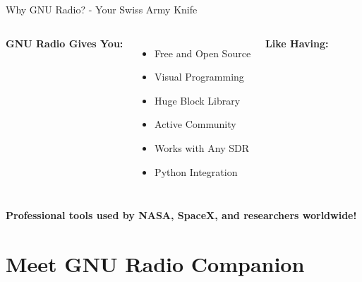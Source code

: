\documentclass[aspectratio=169,11pt]{beamer}
\begin{document}
\begin{frame}{Why GNU Radio? - Your Swiss Army Knife}
\begin{columns}
\textbf{\Large GNU Radio Gives You:}
\begin{itemize}
    \item \textcolor{radioblue}{Free and Open Source}
    \item \textcolor{radiogreen}{Visual Programming}
    \item \textcolor{radioorange}{Huge Block Library}
    \item \textcolor{radiopurple}{Active Community}
    \item \textcolor{radiogray}{Works with Any SDR}
    \item \textcolor{radioblue}{Python Integration}
\end{itemize}

\begin{center}
\textbf{\Large Like Having:}
\end{center}
\end{columns}
\vspace{0.5em}
\begin{center}\colorbox{yellow!20}{\parbox{0.9\textwidth}{
\centering
\large\textbf{Professional tools used by NASA, SpaceX, and researchers worldwide!}
}}\end{center}
\end{frame}


\section{Meet GNU Radio Companion}
\end{document}
